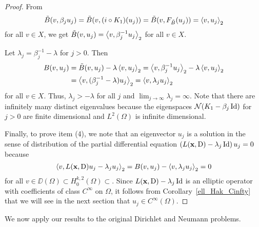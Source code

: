 \begin{proof}
From
\[
\tilde{B}(v, \beta_j u_j) = \tilde{B}(v, (i \circ K_1)(u_j))
= \tilde{B}(v, F_{\tilde{B}}(u_j)) = \left\langle{v} , {u_j}\right\rangle_2
\]
for all $v \in X$, we get
$\displaystyle \tilde{B}(v, u_j) = \left\langle{v} , {\beta_j^{-1}u_j}\right\rangle_2$ for all
$v \in X$.

Let $\lambda_j = \beta_j^{-1}-\lambda$ for $j>0$.  Then 
\begin{align*}
B(v,u_j) &= \tilde{B}(v,u_j) - \lambda \left\langle{v} , {u_j}\right\rangle_2
=\left\langle{v} , {\beta_j^{-1}u_j}\right\rangle_2 - \lambda \left\langle{v} , {u_j}\right\rangle_2 \\
&= \left\langle{v} , {(\beta_j^{-1}-\lambda)u_j}\right\rangle_2 = \left\langle{v} , {\lambda_j u_j}\right\rangle_2
\end{align*}
for all $v \in X$.  Thus, $\lambda_j > -\lambda$ for all $j$ and
$\displaystyle \lim_{j\rightarrow \infty} \lambda_j = \infty$.
Note that there are infinitely many distinct eigenvalues because the
eigenspaces $\mathcal{N}(K_1-\beta_j \operatorname{Id})$ for $j>0$ are
finite dimensional and $\displaystyle L^2(\Omega)$ is infinite dimensional.

Finally, to prove item (4), we note that an
eigenvector $u_j$ is a solution in the sense of distribution of the
partial differential equation
$\displaystyle \left(L(\mathbf{x},\operatorname{D}) - \lambda_j \operatorname{Id} \right)u_j = 0$
because
\[
\left\langle{v} , {L(\mathbf{x},\operatorname{D})u_j - \lambda_j u_j}\right\rangle_2
= B(v,u_j) - \left\langle{v} , {\lambda_j u_j}\right\rangle_2 = 0
\]
for all
$\displaystyle v \in \DD(\Omega) \subset H^{k,2}_0(\Omega) \subset$.  Since
$L(\mathbf{x},\operatorname{D}) - \lambda_j \operatorname{Id}$ is an elliptic operator with
coefficients of class $\displaystyle C^\infty$ on $\Omega$, it follows from
Corollary~\ref{ell_Hak_Cinfty} that we will see in the next section
that $\displaystyle u_j \in C^\infty(\Omega)$.
\end{proof}

We now apply our results to the original Dirichlet and Neumann
problems.

